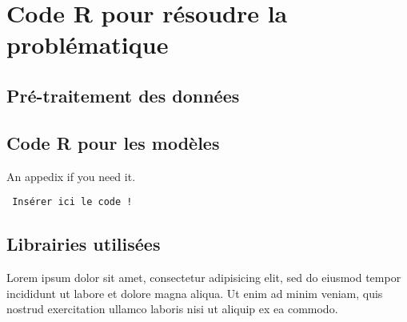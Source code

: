 \documentclass[a4paper, oneside, 12pt, final]{extreport}
\begin{document}
\newpage
\appendix
{}

\chapter{Code R pour résoudre la problématique}
\label{chap:appendix}


\section{Pré-traitement des données}
\section{Code R pour les modèles}

An appedix if you need it.

\begin{verbatim}
 Insérer ici le code !
 \end{verbatim}

\section{Librairies utilisées}

Lorem ipsum dolor sit amet, consectetur adipisicing elit, sed do eiusmod
tempor incididunt ut labore et dolore magna aliqua. Ut enim ad minim veniam,
quis nostrud exercitation ullamco laboris nisi ut aliquip ex ea commodo.


\nocite{*}







%



\cleardoublepage%


\printglossaries
\printindex


\end{document}
